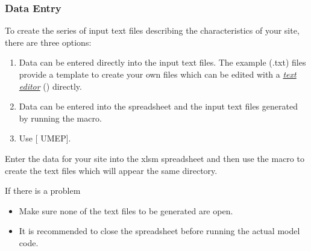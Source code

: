 \documentclass[letterpaper,10pt,english]{sphinxmanual}
\begin{document}
\subsubsection{Data Entry}
\label{\detokenize{prepare-to-run-the-model:data-entry}}
To create the series of input text files describing the characteristics
of your site, there are three options:
\begin{enumerate}
\item {} 
Data can be entered directly into the input text files. The example
(.txt) files provide a template to create your own files which can be
edited with a {\hyperref[\detokenize{prepare-to-run-the-model:A_text_editor}]{\emph{text editor}}} () directly.

\item {} 
Data can be entered into the spreadsheet  and
the input text files generated by running the macro.

\item {} 
Use {[}\textbar{} UMEP{]}.

\end{enumerate}

 Enter the data for your site into the xlsm
spreadsheet  and then use the macro to create the
text files which will appear the same directory.

If there is a problem
\begin{itemize}
\item {} 
Make sure none of the text files to be generated are open.

\item {} 
It is recommended to close the spreadsheet before running the actual
model code.

\end{itemize}
\end{document}
